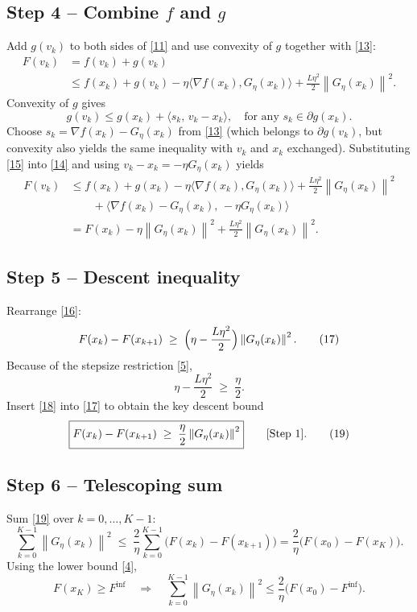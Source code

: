\documentclass{article}
\newcommand{\grad}{\nabla}
\newcommand{\norm}[1]{\left\|#1\right\|}
\begin{document}
\subsection*{Step 4 – Combine $f$ and $g$}
Add $g(v_{k})$ to both sides of \eqref{11} and use convexity of $g$ together with \eqref{13}:
\[
\begin{aligned}
F(v_{k}) & = f(v_{k})+g(v_{k})\\
&\le f(x_{k})+g(v_{k})
-\eta\langle\grad f(x_{k}),G_{\eta}(x_{k})\rangle
+\frac{L\eta^{2}}{2}\norm{G_{\eta}(x_{k})}^{2}.
\end{aligned}
\tag{14}
\]
Convexity of $g$ gives
\[
g(v_{k})\le g(x_{k})+\langle s_{k},\,v_{k}-x_{k}\rangle,
\quad\text{for any } s_{k}\in\partial g(x_{k}).
\tag{15}
\]
Choose $s_{k}= \grad f(x_{k})-G_{\eta}(x_{k})$ from \eqref{13} (which belongs to $\partial g(v_{k})$, but convexity also yields the same inequality with $v_{k}$ and $x_{k}$ exchanged). Substituting \eqref{15} into \eqref{14} and using $v_{k}-x_{k}=-\eta G_{\eta}(x_{k})$ yields
\[
\begin{aligned}
F(v_{k})
&\le f(x_{k})+g(x_{k})
-\eta\langle\grad f(x_{k}),G_{\eta}(x_{k})\rangle
+\frac{L\eta^{2}}{2}\norm{G_{\eta}(x_{k})}^{2}
\\
&\qquad
+\langle \grad f(x_{k})-G_{\eta}(x_{k}),\, -\eta G_{\eta}(x_{k})\rangle\\[1ex]
&=F(x_{k})-\eta\norm{G_{\eta}(x_{k})}^{2}
+\frac{L\eta^{2}}{2}\norm{G_{\eta}(x_{k})}^{2}.
\end{aligned}
\tag{16}
\]

\subsection*{Step 5 – Descent inequality}
Rearrange \eqref{16}:
\[
F(x_{k})-F(x_{k+1})
\;\ge\;
\Bigl(\eta-\frac{L\eta^{2}}{2}\Bigr)\norm{G_{\eta}(x_{k})}^{2}.
\tag{17}
\]
Because of the stepsize restriction \eqref{5},
\[
\eta-\frac{L\eta^{2}}{2}\;\ge\;\frac{\eta}{2}.
\tag{18}
\]
Insert \eqref{18} into \eqref{17} to obtain the key descent bound
\[
\boxed{%
F(x_{k})-F(x_{k+1})\;\ge\;\frac{\eta}{2}\norm{G_{\eta}(x_{k})}^{2}
}\qquad\text{[Step 1]}.
\tag{19}
\]

\subsection*{Step 6 – Telescoping sum}
Sum \eqref{19} over $k=0,\dots,K-1$:
\[
\sum_{k=0}^{K-1}\norm{G_{\eta}(x_{k})}^{2}
\;\le\;\frac{2}{\eta}\sum_{k=0}^{K-1}\bigl(F(x_{k})-F(x_{k+1})\bigr)
=\frac{2}{\eta}\bigl(F(x_{0})-F(x_{K})\bigr).
\tag{20}
\]
Using the lower bound \eqref{4},
\[
F(x_{K})\ge F^{\inf}\quad\Longrightarrow\quad
\sum_{k=0}^{K-1}\norm{G_{\eta}(x_{k})}^{2}
\le\frac{2}{\eta}\bigl(F(x_{0})-F^{\inf}\bigr).
\tag{21}
\]
\end{document}
